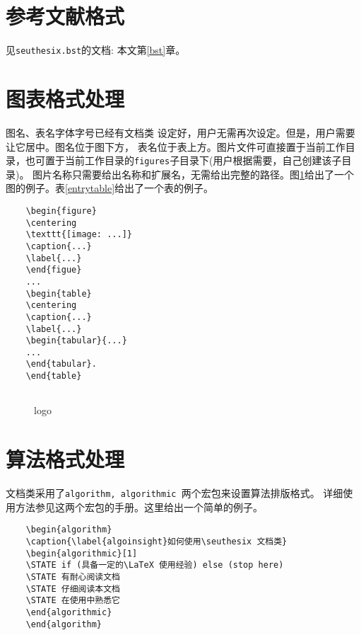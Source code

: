 \documentclass[figurelist,tablelist,algorithmlist,nomlist,masters]{seuthesix}
\begin{document}
\section{参考文献格式}
见\verb+seuthesix.bst+的文档: 本文第\ref{bst}章。

\section{图表格式处理}
图名、表名字体字号已经有文档类 设定好，用户无需再次设定。但是，用户需要让它居中。图名位于图下方，
表名位于表上方。图片文件可直接置于当前工作目录，也可置于当前工作目录的\texttt{figures}子目录下(用户根据需要，自己创建该子目录)。
图片名称只需要给出名称和扩展名，无需给出完整的路径。图\ref{logo}给出了一个图的例子。表\ref{entrytable}给出了一个表的例子。
{\color{magenta}
	\begin{verbatim}
	\begin{figure}
	\centering
	\texttt{[image: ...]}
	\caption{...}
	\label{...}
	\end{figue}
	...
	\begin{table}
	\centering
	\caption{...}
	\label{...}
	\begin{tabular}{...}
	...
	\end{tabular}.
	\end{table}
	
	\end{verbatim}
}

\begin{figure}
	\centering
	\caption{\seuthesix logo\label{logo}}
	\chuhao \seuthesix
\end{figure}

\section{算法格式处理}
\seuthesix 文档类采用了\texttt{algorithm, algorithmic }两个宏包来设置算法排版格式。
详细使用方法参见这两个宏包的手册。这里给出一个简单的例子。
{\color{magenta}
	\begin{verbatim}
	\begin{algorithm}
	\caption{\label{algoinsight}如何使用\seuthesix 文档类}
	\begin{algorithmic}[1]
	\STATE if (具备一定的\LaTeX 使用经验) else (stop here)
	\STATE 有耐心阅读文档
	\STATE 仔细阅读本文档
	\STATE 在使用中熟悉它
	\end{algorithmic}
	\end{algorithm}
	\end{verbatim}
}
\end{document}
